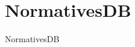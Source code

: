 \chapter{Normatives\+DB}
\hypertarget{md_README}{}\label{md_README}
\label{md_README_autotoc_md0}%
%


Normatives\+DB 